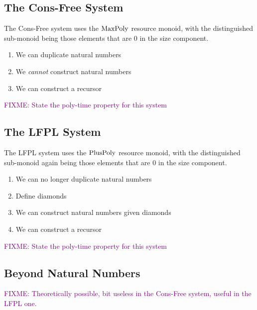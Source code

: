 \documentclass[acmsmall,review]{acmart}
\newcommand{\bob}[1]{\textcolor{purple}{FIXME: #1}}
\begin{document}
\subsection{The Cons-Free System}

The Cons-Free system uses the $\mathrm{MaxPoly}$ resource monoid, with the
distinguished sub-monoid being those elements that are $0$ in the size
component.

\begin{enumerate}
\item We can duplicate natural numbers
\item We \emph{cannot} construct natural numbers
\item We can construct a recursor
\end{enumerate}

\begin{theorem}
  \label{thm:cons-free-soundness}
  \bob{State the poly-time property for this system}
\end{theorem}

\subsection{The LFPL System}

The LFPL system uses the $\mathrm{PlusPoly}$ resource monoid, with the
distinguished sub-monoid again being those elements that are $0$ in
the size component.

\begin{enumerate}
\item We can no longer duplicate natural numbers
\item Define diamonds
\item We can construct natural numbers given diamonds
\item We can construct a recursor
\end{enumerate}

\begin{theorem}
  \label{thm:lfpl-soundness}
  \bob{State the poly-time property for this system}
\end{theorem}


\subsection{Beyond Natural Numbers}

\bob{Theoretically possible, bit useless in the Cons-Free system,
  useful in the LFPL one}.
\end{document}
